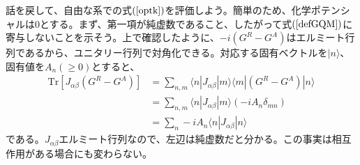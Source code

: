 \documentclass[12pt]{jsbook}
\newcommand{\la}{\langle}
\newcommand{\ra}{\rangle}
\begin{document}
話を戻して、自由な系での式$(\ref{optk})$を評価しよう。簡単のため、化学ポテンシャルは$0$とする。まず、第一項が純虚数であること、したがって式$(\ref{defGQM})$に寄与しないことを示そう。上で確認したように、$-i(G^R - G^{A})$はエルミート行列であるから、ユニタリー行列で対角化できる。対応する固有ベクトルを$|n\ra$、固有値を$A_n(\geq 0)$とすると、
\begin{align}
\mathrm{Tr}[J_{\alpha\beta}(G^{R} - G^{A})] &= \displaystyle \sum_{n,m}\la n|J_{\alpha\beta}|m\ra\la m|(G^{R}-G^{A})|n\ra\\
                                   &= \displaystyle \sum_{n,m}\la n|J_{\alpha\beta}|m\ra(-iA_n\delta_{mn})\\
\label{flast}                                   &= \displaystyle \sum_{n}-iA_n\la n |J_{\alpha\beta}|n\ra
\end{align}
である。$J_{\alpha\beta}$エルミート行列なので、左辺は純虚数だと分かる。この事実は相互作用がある場合にも変わらない。
\end{document}
